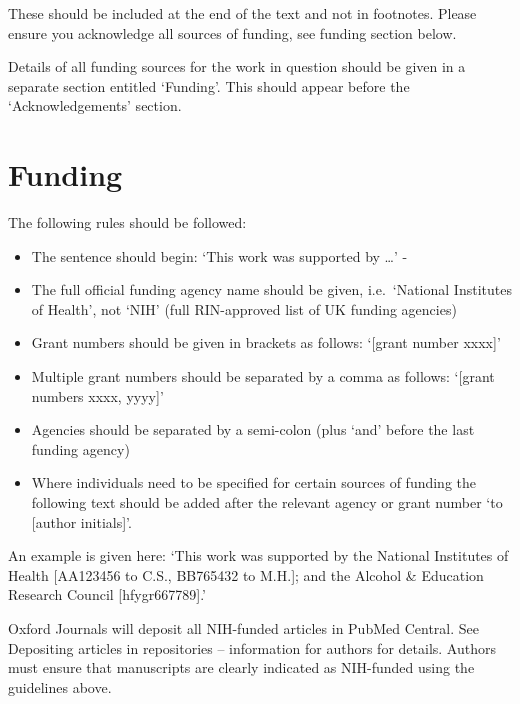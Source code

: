 \documentclass{bioinfo}
\providecommand{\tightlist}{%
  \setlength{\itemsep}{0pt}\setlength{\parskip}{0pt}}
\begin{document}
These should be included at the end of the text and not in footnotes.
Please ensure you acknowledge all sources of funding, see funding
section below.

Details of all funding sources for the work in question should be given
in a separate section entitled `Funding'. This should appear before the
`Acknowledgements' section.

\section*{Funding}

The following rules should be followed:

\begin{itemize}
\tightlist
\item
  The sentence should begin: `This work was supported by \ldots{}' -
\item
  The full official funding agency name should be given, i.e.~`National
  Institutes of Health', not `NIH' (full RIN-approved list of UK funding
  agencies)
\item
  Grant numbers should be given in brackets as follows: `{[}grant number
  xxxx{]}'
\item
  Multiple grant numbers should be separated by a comma as follows:
  `{[}grant numbers xxxx, yyyy{]}'
\item
  Agencies should be separated by a semi-colon (plus `and' before the
  last funding agency)
\item
  Where individuals need to be specified for certain sources of funding
  the following text should be added after the relevant agency or grant
  number `to {[}author initials{]}'.
\end{itemize}

An example is given here: `This work was supported by the National
Institutes of Health {[}AA123456 to C.S., BB765432 to M.H.{]}; and the
Alcohol \& Education Research Council {[}hfygr667789{]}.'

Oxford Journals will deposit all NIH-funded articles in PubMed Central.
See Depositing articles in repositories -- information for authors for
details. Authors must ensure that manuscripts are clearly indicated as
NIH-funded using the guidelines above.




\end{document}
